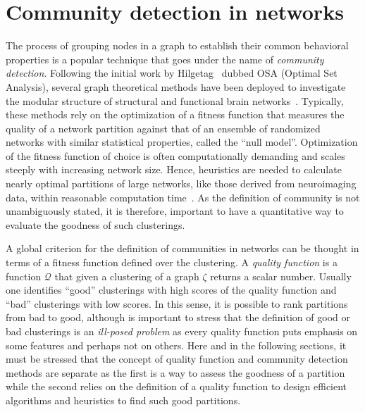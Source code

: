 \section{Community detection in networks}
\label{sec:communitydetectioninnetworks}
The process of grouping nodes in a graph to establish their common behavioral properties is a popular technique that goes under the name of \emph{community detection}.
Following the initial work by Hilgetag~\cite{hilgetag2000a} dubbed OSA (Optimal Set Analysis), several graph theoretical methods have been deployed to investigate the modular structure of structural and functional brain networks~\cite{meunier2009,meunier2010,power2011,stam2007,stam2014}.
Typically, these methods rely on the optimization of a fitness function that measures the quality of a network partition against that of an ensemble of randomized networks with similar statistical properties, called the ``null model''.
Optimization of the fitness function of choice is often computationally demanding and scales steeply with increasing network size.
Hence, heuristics are needed to calculate nearly optimal partitions of large networks, like those derived from neuroimaging data, within reasonable computation time~\cite{blondel2008,rosvall2008,raghavan2007}.
As the definition of community is not unambiguously stated, it is therefore, important to have a quantitative way to evaluate the goodness of such clusterings.

A global criterion for the definition of communities in networks can be thought in terms of a fitness function defined over the clustering.
A \emph{quality function} is a function $\mathcal{Q}$ that given a clustering of a graph $\zeta$ returns a scalar number. Usually one identifies ``good'' clusterings with high scores of the quality function and ``bad'' clusterings with low scores. In this sense, it is possible to rank partitions from bad to good, although is important to stress that the definition of good or bad clusterings is an \emph{ill-posed problem} as every quality function puts emphasis on some features and perhaps not on others. 
Here and in the following sections, it must be stressed that the concept of quality function and community detection methods are separate as the first is a way to assess the goodness of a partition while the second relies on the definition of a quality function to design efficient algorithms and heuristics to find such good partitions.

